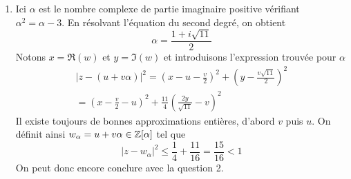 \begin{enumerate}
\begin{enumerate}
    \item Ici $\alpha$ est le nombre complexe de partie imaginaire positive vérifiant $\alpha^2 = \alpha - 3$. En résolvant l'équation du second degré, on obtient
    \begin{displaymath}
      \alpha = \frac{1+i\sqrt{11}}{2}
    \end{displaymath}
Notons $x=\Re(w)$ et $y=\Im(w)$ et introduisons l'expression trouvée pour $\alpha$
\begin{multline*}
  |z-(u+v\alpha)|^2 = \left(x-u-\frac{v}{2} \right)^2 + \left( y-\frac{v\sqrt{11}}{2}\right)^2\\
  = \left(x -\frac{v}{2} - u\right)^2 + \frac{11}{4}\left( \frac{2y}{\sqrt{11}} -v\right)^2  
\end{multline*}
Il existe toujours de bonnes approximations entières, d'abord $v$ puis $u$. On définit ainsi $w_{\alpha} = u + v\alpha \in \mathbb{Z}[\alpha]$ tel que 
\begin{displaymath}
  \left|z-w_{\alpha}\right|^2 \leq \frac{1}{4} + \frac{11}{16} = \frac{15}{16} < 1
\end{displaymath}
On peut donc encore conclure avec la question 2.
  \end{enumerate}

\end{enumerate}

